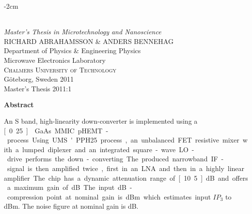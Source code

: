 \else
	\begin{titlepage}
	\begin{adjustwidth}{}{-2cm}
	
	\mbox{}
	\vfill
	\addtolength{\voffset}{2cm}
	\begin{flushleft}
		{ \\[0.5cm]
		\emph{\Large Master's Thesis in Microtechnology and Nanoscience} \\[.8cm]
		
		{\Large RICHARD ABRAHAMSSON \& ANDERS BENNEHAG}\\[.8cm]
		
		{\Large Department of Physics \& Engineering Physics \\
		Microwave Electronics Laboratory \\
		\textsc{Chalmers University of Technology} \\
		Göteborg, Sweden 2011 \\
		Master's Thesis 2011:1\\
		} 
		}
	\end{flushleft}
	
	\end{adjustwidth}
	\end{titlepage}
	\ClearShipoutPicture
	
\fi

\newpage

\ifdefined\saab
\else
	\clearpage
	\thispagestyle{empty}
\fi

\begin{center}
{\bf Abstract} \\[0.4cm]
\end{center}
	An S band, high-linearity down-converter is implemented using a \unit[0.25]{\mum} GaAs MMIC pHEMT-process. Using UMS' PPH25 process, an unbalanced FET resistive mixer with a lumped diplexer and an integrated square-wave LO-drive performs the down-converting. The produced narrowband IF-signal is then  amplified twice, first in an LNA and then in a highly linear amplifier. The chip has a dynamic attenuation range of \unit[10.5]{dB} and offers a maximum gain of \unit[15]{dB}. The input \unit[1]{dB}-compression point at nominal gain is \unit[10]{dBm} which estimates input $IP_3$ to \unit[20]{dBm}. The noise figure at nominal gain is \unit[11]{dB}.
	
